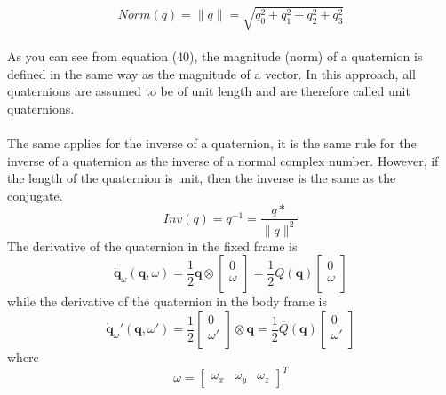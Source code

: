 \begin{equation}
  Norm(q) = \|q\| = \sqrt{q_0^2 + q_1^2 + q_2^2 + q_3^2}
\end{equation}
\\
As you can see from equation (40), the magnitude (norm) of a quaternion is defined in the same way as the magnitude of a vector. In this approach, all%
quaternions are assumed to be of unit length and are therefore called unit quaternions.
\\\\
The same applies for the inverse of a quaternion, it is the same rule for the inverse of a quaternion as the inverse of a normal complex number. However, if the length of the quaternion is unit, then the inverse is the same as the conjugate.
\\
\begin{equation}
  Inv(q) = q^{-1} = \frac{q*}{\|q\|^2}
\end{equation}
The derivative of the quaternion in the fixed frame is
\begin{equation}
   \dot{\textbf{q}}_\omega(\textbf{q}, \omega) = \frac{1}{2} \textbf{q} \otimes \begin{bmatrix}
    0 \\[0.3em]
    \omega\\[0.3em]
\end{bmatrix} = \frac{1}{2} Q(\textbf{q}) \begin{bmatrix}
    0 \\[0.3em]
    \omega\\[0.3em]
\end{bmatrix}
\end{equation}
while the derivative of the quaternion in the body frame is
\begin{equation}
   \dot{\textbf{q}}_\omega\prime(\textbf{q}, \omega\prime) = \frac{1}{2} \begin{bmatrix}
    0 \\[0.3em]
    \omega\prime\\[0.3em]
\end{bmatrix} \otimes \textbf{q} = \frac{1}{2} \overline{Q}(\textbf{q}) \begin{bmatrix}
    0 \\[0.3em]
    \omega\prime\\[0.3em]
\end{bmatrix}
\end{equation}
where
\begin{equation}
\omega = 
\begin{bmatrix}
    \omega_x &\omega_y & \omega_z
\end{bmatrix}^T
\end{equation}
